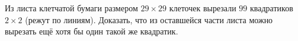 Из листа клетчатой бумаги размером $29 \times 29$ клеточек вырезали $99$ квадратиков $2 \times 2$ (режут по линиям). Доказать, что из оставшейся части листа можно вырезать ещё хотя бы один такой же квадратик.